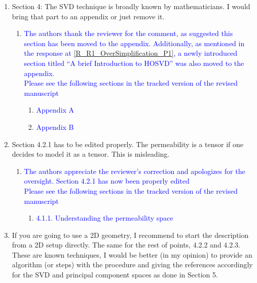 \documentclass[11pt]{letter} %
\newcommand{\blue}{\textcolor{blue}}
\begin{document}
\begin{letter}
{\begin{enumerate}
\begin{enumerate}
\begin{enumerate}
\begin{enumerate}
 \item \blue{2. Upscaling}
\item \blue{2.1. Brief Overview of Upscaling}
   \end{enumerate}
    \end{enumerate}
\item \label{R_R2_SVDWellKnown} Section 4: The SVD technique is broadly known by mathematicians. I would bring that part to an appendix or just remove it.
  \begin{enumerate}
  \item \label{R_R2_SVDWellKnown_1} \blue{The authors thank the reviewer for the comment, as suggested this section has been moved to the appendix. Additionally, as mentioned in the response at \ref{R_R1_OverSimplification_P1}, a newly introduced section titled ``A brief Introduction to HOSVD'' was also moved to the appendix.}\\
    \blue{Please see the following sections in the tracked version of the revised manuscript}
   \begin{enumerate}
 \item \blue{Appendix A}
\item \blue{Appendix B}
   \end{enumerate}
        \end{enumerate}
\item \label{R_R2_TensorCorrection}Section 4.2.1 has to be edited properly. The permeability is a tensor if one decides to model it as a tensor. This is misleading.
  \begin{enumerate}
  \item \label{R_R2_TensorCorrection_1} \blue{The authors appreciate the reviewer's correction and apologizes for the oversight. Section 4.2.1 has now been properly edited}\\
     \blue{Please see the following sections in the tracked version of the revised manuscript}
   \begin{enumerate}
 \item \blue{4.1.1. Understanding the permeability space}
   \end{enumerate}
        \end{enumerate}
  \item \label{R_R2_GeomSetupAlgorithm} If you are going to use a 2D geometry, I recommend to start the description from a 2D setup directly. The same for the rest of points, 4.2.2 and 4.2.3. These are known techniques, I would be better (in my opinion) to provide an algorithm (or steps) with the procedure and giving the references accordingly for the SVD and principal component spaces as done in Section 5.

\end{enumerate}
\end{enumerate}}
\end{letter}
\end{document}
